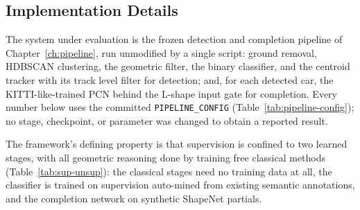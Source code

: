 \documentclass[a4paper,12pt]{report}
\begin{document}

%
%
\subsection{Implementation Details}
\label{sec:eval-pipeline}

The system under evaluation is the frozen detection and completion pipeline of
Chapter~\ref{ch:pipeline}, run unmodified by a single script:
ground removal, HDBSCAN clustering, the geometric
filter, the binary classifier, and the centroid tracker with its track level
filter for detection; and, for each detected car, the KITTI-like-trained PCN
behind the L-shape input gate for completion. Every number below uses the
committed \texttt{PIPELINE\_CONFIG} (Table~\ref{tab:pipeline-config}); no stage,
checkpoint, or parameter was changed to obtain a reported result.

The framework's defining property is that supervision is confined to two learned stages,
with all geometric reasoning done by training free classical methods
(Table~\ref{tab:sup-unsup}): the classical stages need no training data at all, the classifier is
trained on supervision auto-mined from existing semantic annotations, and the
completion network on synthetic ShapeNet partials.
\end{document}

